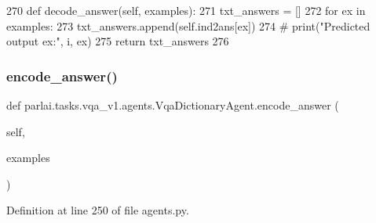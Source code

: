\begin{DoxyCode}
270     \textcolor{keyword}{def }decode\_answer(self, examples):
271         txt\_answers = []
272         \textcolor{keywordflow}{for} ex \textcolor{keywordflow}{in} examples:
273             txt\_answers.append(self.ind2ans[ex])
274             \textcolor{comment}{# print("Predicted output ex:", i, ex)}
275         \textcolor{keywordflow}{return} txt\_answers
276 
\end{DoxyCode}
\mbox{\label{classparlai_1_1tasks_1_1vqa__v1_1_1agents_1_1VqaDictionaryAgent_a6e40e864eceef9b413db16c9ebb9b22b}} 
\subsubsection{\texorpdfstring{encode\+\_\+answer()}{encode\_answer()}}
{\footnotesize\ttfamily def parlai.\+tasks.\+vqa\+\_\+v1.\+agents.\+Vqa\+Dictionary\+Agent.\+encode\+\_\+answer (\begin{DoxyParamCaption}\item[{}]{self,  }\item[{}]{examples }\end{DoxyParamCaption})}



Definition at line 250 of file agents.\+py.


